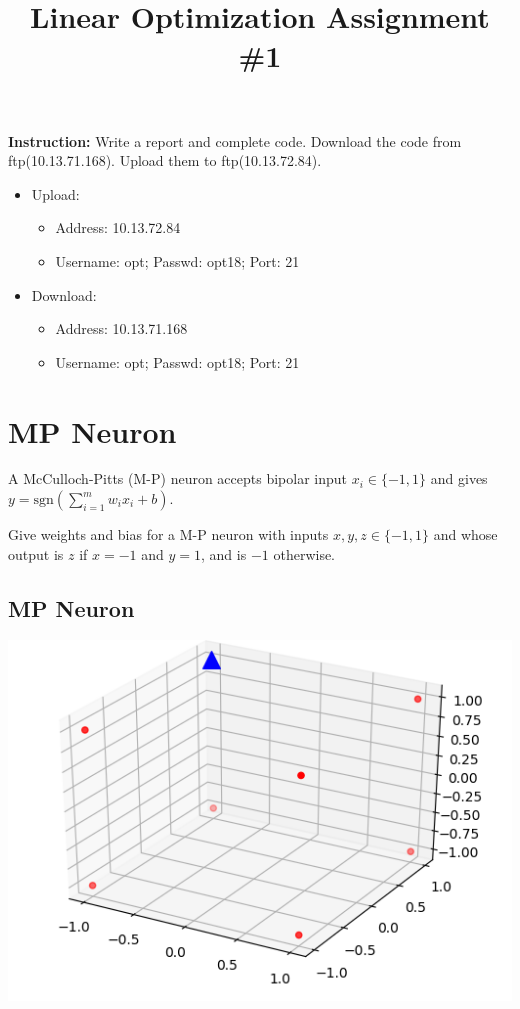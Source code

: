 \documentclass[12pt]{article}
\title{\textbf{Linear Optimization Assignment \#1}}
\author{}
\date{}
\providecommand{\tightlist}{%
	\setlength{\itemsep}{0pt}\setlength{\parskip}{0pt}}
\begin{document}
\maketitle

\textbf{\color{NavyBlue}Instruction:} Write a report and complete code.
Download the code from ftp(10.13.71.168). Upload them to ftp(10.13.72.84).
\begin{itemize}
	\tightlist
	\item Upload:
	      \begin{itemize}
		      \tightlist
		      \item    Address: 10.13.72.84
		      \item Username: opt; Passwd:  opt18; Port: 21
	      \end{itemize}
	\item Download:
	      \begin{itemize}
		      \tightlist
		      \item Address: 10.13.71.168
		      \item  Username: opt; Passwd:  opt18; Port: 21
	      \end{itemize}
\end{itemize}



\section{MP Neuron}

A McCulloch-Pitts (M-P) neuron accepts bipolar input $x_i \in \{-1,1\}$ and gives  $y=\mathrm{sgn} (\sum_{i=1}^{m} w_ix_i + b) $.

Give weights and bias for a M-P neuron with inputs
$x,y,z \in \{-1,1\}$ and whose output is  $z$ if $x = -1$ and $y = 1$, and is $-1$ otherwise.

\subsection{MP Neuron}

\begin{center}
	\includegraphics[width=.5\textwidth]{fig/2018-04-02-14-19-18.png}
\end{center}
\end{document}
